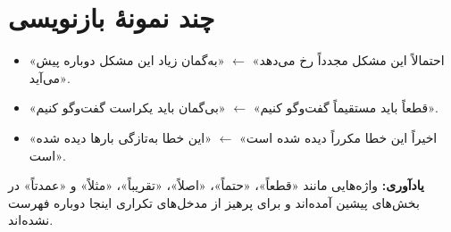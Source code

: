 \section*{چند نمونهٔ بازنویسی}
\begin{itemize}
\item «احتمالاً این مشکل مجدداً رخ می‌دهد» $\leftarrow$ «به‌گمان زیاد این مشکل دوباره پیش می‌آید».
\item «قطعاً باید مستقیماً گفت‌وگو کنیم» $\leftarrow$ «بی‌گمان باید یکراست گفت‌وگو کنیم».
\item «اخیراً این خطا مکرراً دیده شده است» $\leftarrow$ «این خطا به‌تازگی بارها دیده شده است».
\end{itemize}

\noindent
\textbf{یادآوری:} واژه‌هایی مانند «قطعاً»، «حتماً»، «اصلاً»، «تقریباً»، «مثلاً» و «عمدتاً»
در بخش‌های پیشین آمده‌اند و برای پرهیز از مدخل‌های تکراری اینجا دوباره فهرست نشده‌اند.
